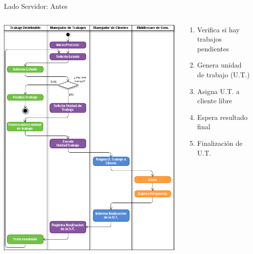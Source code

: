 \begin{frame}{Lado Servidor: Antes}
    \begin{columns}[T]
        \begin{column}{.55\textwidth}
            \centering
            \includegraphics[scale=0.23]{images/ActivityFuDServer-Orig.png}
        \end{column}
        \begin{column}{.45\textwidth}
            \begin{enumerate}
                \item   Verifica si hay trabajos pendientes
                \vspace{0.2cm}
                \item   Genera unidad de trabajo (U.T.)
                \vspace{0.2cm}
                \item   Asigna U.T. a cliente libre
                \vspace{0.2cm}
                \item   Espera resultado final
                \vspace{0.2cm}
                \item   Finalización de U.T.
            \end{enumerate}
        \end{column}
    \end{columns}
\end{frame}

